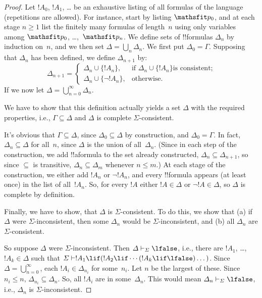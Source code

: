 \documentclass[../../../include/open-logic-section]{subfiles}
\begin{document}
\begin{proof}
Let $!A_0$, $!A_1$, \dots{} be an exhaustive listing of all formulas
of the language (repetitions are allowed). For instance, start by
listing $\Obj p_0$, and at each stage $n \ge 1$ list the finitely many
formulas of length~$n$ using only variables among $\Obj p_0$,
\dots,~$\Obj p_n$. We define sets of !!{formula}s $\Delta_n$ by
induction on~$n$, and we then set $\Delta = \bigcup_n \Delta_n$. We
first put $\Delta_0 = \Gamma$. Supposing that $\Delta_n$ has been
defined, we define $\Delta_{n+1}$ by:
\[
\Delta_{n+1} =
\begin{cases}
  \Delta_n \cup \{!A_n\}, & \text{if $\Delta_n \cup \{ !A_n\}$
    is consistent;} \\
  \Delta_n \cup \{ \lnot !A_n\}, & \text{otherwise.}
\end{cases}
\]
If we now let $\Delta = \bigcup_{n=0}^\infty \Delta_n$.

We have to show that this definition actually yields a set $\Delta$
with the required properties, i.e., $\Gamma \subseteq \Delta$ and
$\Delta$ is complete $\Sigma$-consistent.

It's obvious that $\Gamma \subseteq \Delta$, since $\Delta_0 \subseteq
\Delta$ by construction, and $\Delta_0 = \Gamma$. In fact, $\Delta_n
\subseteq \Delta$ for all~$n$, since $\Delta$ is the union of
all~$\Delta_n$. (Since in each step of the construction, we add
!!a{formula} to the set already constructed, $\Delta_n \subseteq
\Delta_{n+1}$, so since $\subseteq$ is transitive, $\Delta_n \subseteq
\Delta_{m}$ whenever $n \le m$.)  At each stage of the construction, we
either add $!A_n$ or $\lnot !A_n$, and every !!{formula} appears (at
least once) in the list of all~$!A_n$. So, for every $!A$ either $!A
\in \Delta$ or $\lnot !A \in \Delta$, so $\Delta$ is complete by
definition.

Finally, we have to show, that $\Delta$ is $\Sigma$-consistent.  To do
this, we show that (a) if $\Delta$ were $\Sigma$-inconsistent, then
some $\Delta_n$ would be $\Sigma$-inconsistent, and (b) all $\Delta_n$
are $\Sigma$-consistent.
  
So suppose $\Delta$ were $\Sigma$-inconsistent. Then $\Delta
\Proves[\Sigma] \lfalse$, i.e., there are $!A_1$, \dots,~$!A_k \in
\Delta$ such that $\Sigma \Proves !A_1 \lif (!A_2 \lif \cdots (!A_k
\lif \lfalse)\dots)$. Since $\Delta = \bigcup_{n=0}^\infty$, each
$!A_i \in \Delta_{n_i}$ for some~$n_i$. Let $n$ be the largest of
these. Since $n_i \le n$, $\Delta_{n_i} \subseteq \Delta_n$. So, all
$!A_i$ are in some~$\Delta_n$. This would mean $\Delta_n
\Proves[\Sigma] \lfalse$, i.e., $\Delta_n$ is $\Sigma$-inconsistent.


\end{proof}
\end{document}
